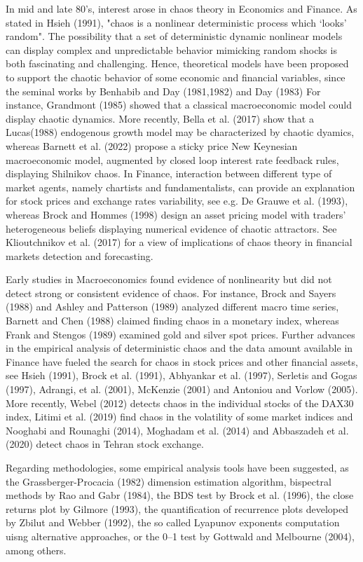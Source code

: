 \documentclass[12pt]{article}
\begin{document}
In mid and late 80's, interest arose in chaos theory in Economics and Finance. 
As stated in Hsieh (1991), "chaos is a nonlinear deterministic process which `looks' random".
The possibility that
a set of deterministic dynamic nonlinear models can display complex and unpredictable behavior mimicking random shocks is both fascinating and challenging. Hence, theoretical models 
have been proposed to support the chaotic behavior of some economic and financial variables, since the seminal works by Benhabib and Day (1981,1982) and Day (1983)
For instance, Grandmont (1985) showed that a classical macroeconomic model could display chaotic dynamics.
More recently,  Bella et al. (2017) show that a Lucas(1988) endogenous growth model may be characterized by chaotic dyamics, whereas Barnett et al. (2022) propose a sticky price New Keynesian macroeconomic model, augmented by closed loop interest rate feedback rules, displaying
Shilnikov chaos. In Finance, interaction between different type of market agents, namely chartists and fundamentalists, can provide an explanation for stock prices and exchange rates variability, see e.g. De Grauwe et al. (1993), whereas
Brock and Hommes (1998) design an asset pricing model with traders' heterogeneous beliefs displaying numerical evidence of chaotic attractors. See Klioutchnikov et al. (2017) for a view of implications of chaos theory in financial markets detection and forecasting.

Early studies in Macroeconomics found evidence of nonlinearity but did not detect strong or consistent evidence of chaos. For instance,
Brock and Sayers (1988) and Ashley and Patterson (1989) analyzed different macro time series, Barnett and Chen (1988) claimed finding chaos in a monetary index, whereas Frank and Stengos (1989) examined gold and silver spot prices. Further advances in the empirical analysis of deterministic chaos and the data amount available in Finance have fueled the search for chaos in stock prices and other financial assets, see Hsieh (1991), Brock et al. (1991), Abhyankar et al. (1997), Serletis and Gogas (1997), Adrangi, et al. (2001), McKenzie (2001) and Antoniou and Vorlow (2005). More recently, Webel (2012) detects chaos in the individual stocks of the DAX30 index, Litimi et al. (2019) find chaos in the volatility of some market indices and Nooghabi and Rounaghi (2014), Moghadam et al. (2014) and Abbaszadeh et al. (2020) detect chaos in Tehran stock exchange.


Regarding methodologies, some empirical analysis tools have been suggested, as the Grassberger-Procacia (1982) dimension estimation algorithm, bispectral methods by  Rao and Gabr (1984), the BDS test by Brock et al. (1996), the close returns plot by Gilmore (1993), the quantification of recurrence plots developed by Zbilut and Webber (1992), the so called Lyapunov exponents computation uisng alternative approaches, or the 0--1 test by Gottwald and Melbourne (2004), among others.
\end{document}
